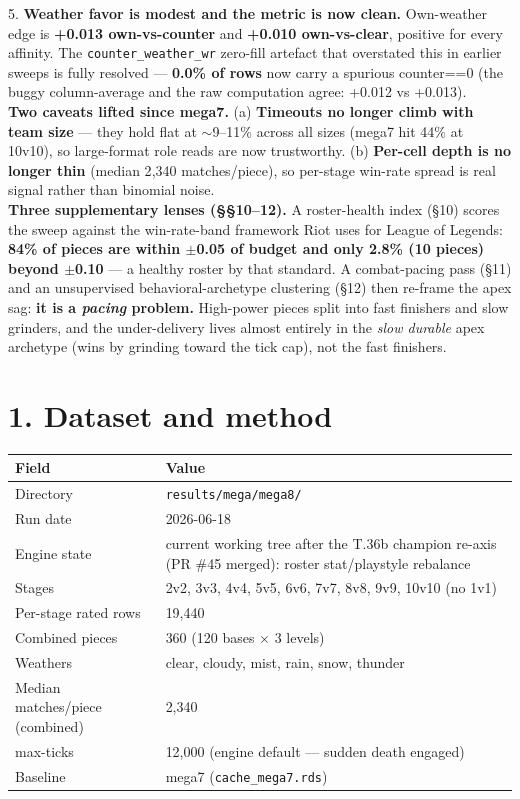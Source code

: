 \documentclass[10pt]{article}
\begin{document}
5. \textbf{Weather favor is modest and the metric is now clean.} Own-weather edge is \textbf{+0.013 own-vs-counter} and \textbf{+0.010 own-vs-clear}, positive for every affinity. The \texttt{counter\_\allowbreak{}weather\_\allowbreak{}wr} zero-fill artefact that overstated this in earlier sweeps is fully resolved --- \textbf{0.0\% of rows} now carry a spurious counter==0 (the buggy column-average and the raw computation agree: +0.012 vs +0.013).\\

\textbf{Two caveats lifted since mega7.} (a) \textbf{Timeouts no longer climb with team size} --- they hold flat at $\sim$9--11\% across all sizes (mega7 hit 44\% at 10v10), so large-format role reads are now trustworthy. (b) \textbf{Per-cell depth is no longer thin} (median 2{,}340 matches/piece), so per-stage win-rate spread is real signal rather than binomial noise.\\

\textbf{Three supplementary lenses (\S\S{}10--12).} A roster-health index (\S{}10) scores the sweep against the win-rate-band framework Riot uses for League of Legends: \textbf{84\% of pieces are within $\pm$0.05 of budget and only 2.8\% (10 pieces) beyond $\pm$0.10} --- a healthy roster by that standard. A combat-pacing pass (\S{}11) and an unsupervised behavioral-archetype clustering (\S{}12) then re-frame the apex sag: \textbf{it is a \emph{pacing} problem.} High-power pieces split into fast finishers and slow grinders, and the under-delivery lives almost entirely in the \emph{slow durable} apex archetype (wins by grinding toward the tick cap), not the fast finishers.\\

\section*{1. Dataset and method}

\medskip
\begin{tabularx}{\linewidth}{LL}
\toprule
\textbf{Field} & \textbf{Value} \\
\midrule
Directory & \texttt{results/\allowbreak{}mega/\allowbreak{}mega8/\allowbreak{}} \\
Run date & 2026-06-18 \\
Engine state & current working tree after the T.36b champion re-axis (PR \#45 merged): roster stat/playstyle rebalance \\
Stages & 2v2, 3v3, 4v4, 5v5, 6v6, 7v7, 8v8, 9v9, 10v10 (no 1v1) \\
Per-stage rated rows & 19,440 \\
Combined pieces & 360 (120 bases $\times$ 3 levels) \\
Weathers & clear, cloudy, mist, rain, snow, thunder \\
Median matches/piece (combined) & 2,340 \\
max-ticks & 12,000 (engine default --- sudden death engaged) \\
Baseline & mega7 (\texttt{cache\_\allowbreak{}mega7.\allowbreak{}rds}) \\
\bottomrule
\end{tabularx}
\medskip
\end{document}
